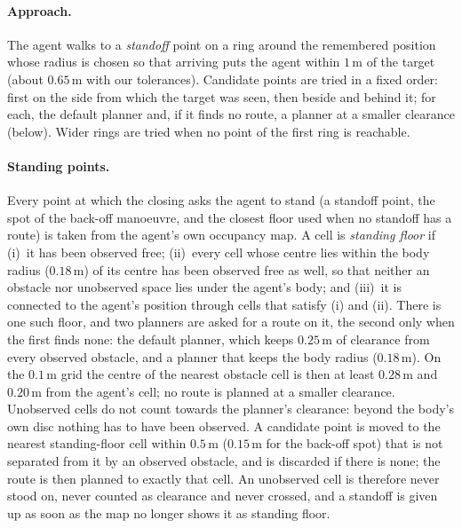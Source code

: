 \documentclass[10pt]{article}
\newcommand{\m}{\,\mathrm{m}}
\begin{document}
\paragraph{Approach.} The agent walks to a \emph{standoff} point on a ring
around the remembered position whose radius is chosen so that arriving puts
the agent within $1\m$ of the target (about $0.65\m$ with our tolerances).
Candidate points are tried in a fixed order: first on the side from which the
target was seen, then beside and behind it; for each, the default planner and,
if it finds no route, a planner at a smaller clearance (below).
Wider rings are tried when no point of the first ring is reachable.

\paragraph{Standing points.} Every point at which the closing asks the agent
to stand (a standoff point, the spot of the back-off manoeuvre, and the
closest floor used when no standoff has a route) is taken from the agent's own
occupancy map. A cell is \emph{standing floor} if
(i)~it has been observed free;
(ii)~every cell whose centre lies within the body radius ($0.18\m$) of its
centre has been observed free as well, so that neither an obstacle nor
unobserved space lies under the agent's body; and
(iii)~it is connected to the agent's position through cells that satisfy (i)
and (ii).
There is one such floor, and two planners are asked for a route on it, the
second only when the first finds none: the default planner, which keeps
$0.25\m$ of clearance from every observed obstacle, and a planner that keeps
the body radius ($0.18\m$). On the $0.1\m$ grid the centre of the nearest
obstacle cell is then at least $0.28\m$ and $0.20\m$ from the agent's cell;
no route is planned at a smaller clearance. Unobserved cells
do not count towards the planner's clearance: beyond the body's own disc
nothing has to have been observed. A
candidate point is moved to the nearest standing-floor cell within $0.5\m$
($0.15\m$ for the back-off spot) that is not separated from it by an observed
obstacle, and is discarded if there is none; the route is then planned to
exactly that cell. An unobserved cell is therefore never stood on, never
counted as clearance and never crossed, and a standoff is given up as soon as
the map no longer shows it as standing floor.
\end{document}
